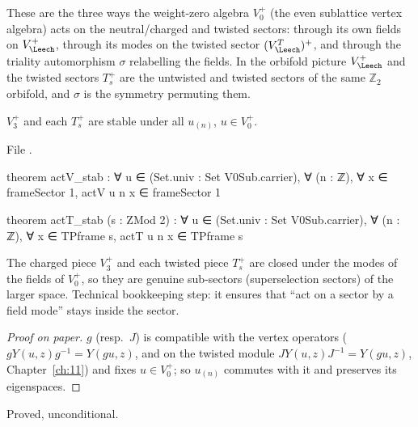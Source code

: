 \begin{physics}
These are the three ways the weight-zero algebra $V_0^+$ (the even sublattice vertex algebra) acts on the neutral/charged and twisted sectors: through its own fields on $V_\Leech^+$, through its modes on the twisted sector $(V_\Leech^T)^+$, and through the triality automorphism $\sigma$ relabelling the fields. In the orbifold picture $V_\Leech^+$ and the twisted sectors $T_s^+$ are the untwisted and twisted sectors of the same $\mathbb Z_2$ orbifold, and $\sigma$ is the symmetry permuting them.
\end{physics}

\begin{lemma}[Stability]\label{ch12:lem:stab}
$V_3^+$ and each $T_s^+$ are stable under all $u_{(n)}$, $u\in V_0^+$.
\end{lemma}
File .
\begin{leancode}
theorem actV_stab : ∀ u ∈ (Set.univ : Set V0Sub.carrier), ∀ (n : ℤ),
    ∀ x ∈ frameSector 1, actV u n x ∈ frameSector 1

theorem actT_stab (s : ZMod 2) : ∀ u ∈ (Set.univ : Set V0Sub.carrier), ∀ (n : ℤ),
    ∀ x ∈ TPframe s, actT u n x ∈ TPframe s
\end{leancode}

\begin{physics}
The charged piece $V_3^+$ and each twisted piece $T_s^+$ are closed under the modes of the fields of $V_0^+$, so they are genuine sub-sectors (superselection sectors) of the larger space. Technical bookkeeping step: it ensures that ``act on a sector by a field mode'' stays inside the sector.
\end{physics}
\begin{proof}[Proof on paper]
$g$ (resp.\ $J$) is compatible with the vertex operators ($gY(u,z)g^{-1}=Y(gu,z)$, and on the twisted
module $JY(u,z)J^{-1}=Y(gu,z)$, Chapter~\ref{ch:11}) and fixes $u\in V_0^+$; so $u_{(n)}$ commutes with it
and preserves its eigenspaces.
\end{proof}
\begin{status}Proved, unconditional.\end{status}

